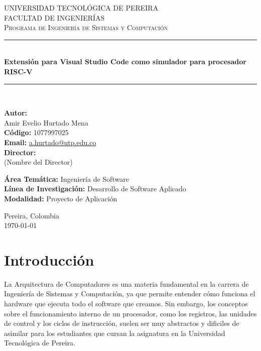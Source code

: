 \documentclass[12pt, letterpaper]{article}
\begin{document}
\begin{titlepage}
    \centering

    \textsc{\LARGE UNIVERSIDAD TECNOLÓGICA DE PEREIRA} \\[0.5cm]
    \textsc{\Large FACULTAD DE INGENIERÍAS} \\[0.5cm]
    \textsc{\large Programa de Ingeniería de Sistemas y Computación} \\[2cm]

    \rule{\textwidth}{0.4pt}\\[0.4cm]
    { \huge \bfseries Extensión para Visual Studio Code como simulador para procesador RISC-V \\[0.4cm] }
    \rule{\textwidth}{0.4pt}\\[2cm]

    \begin{flushleft}
    \textbf{Autor:} \\
    Amir Evelio Hurtado Mena \\
    \textbf{Código:} 1077997025 \\
    \textbf{Email:} \url{a.hurtado@utp.edu.co} \\[1cm]

    \textbf{Director:} \\
    (Nombre del Director) \\[2cm]
    \end{flushleft}

    \begin{center}
    \textbf{Área Temática:} Ingeniería de Software \\
    \textbf{Línea de Investigación:} Desarrollo de Software Aplicado \\[0.5cm]
    \textbf{Modalidad:} Proyecto de Aplicación \\[2cm]
    \end{center}

    \vfill %

    Pereira, Colombia \\
    \today
\end{titlepage}


\newpage
\tableofcontents


\newpage 
\section{Introducción}
La Arquitectura de Computadores es una materia fundamental en la carrera de Ingeniería de Sistemas y Computación, ya que permite entender cómo funciona el hardware que ejecuta todo el software que creamos. Sin embargo, los conceptos sobre el funcionamiento interno de un procesador, como los registros, las unidades de control y los ciclos de instrucción, suelen ser muy abstractos y dificiles de asimilar para los estudiantes que cursan la asignatura en la Universidad Tecnológica de Pereira.
\end{document}
